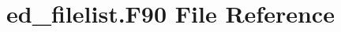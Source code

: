 \hypertarget{ed__filelist_8_f90}{}\section{ed\+\_\+filelist.\+F90 File Reference}
\label{ed__filelist_8_f90}
